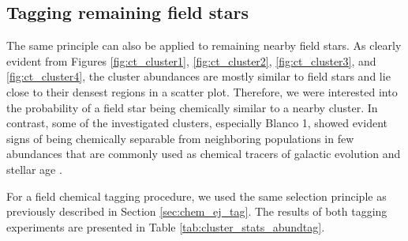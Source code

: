 \subsection{Tagging remaining field stars}
\label{sec:chem_fi_tag}
The same principle can also be applied to remaining nearby field stars. As clearly evident from Figures \ref{fig:ct_cluster1}, \ref{fig:ct_cluster2}, \ref{fig:ct_cluster3}, and \ref{fig:ct_cluster4}, the cluster abundances are mostly similar to field stars and lie close to their densest regions in a scatter plot. Therefore, we were interested into the probability of a field star being chemically similar to a nearby cluster. In contrast, some of the investigated clusters, especially Blanco 1, showed evident signs of being chemically separable from neighboring populations in few abundances that are commonly used as chemical tracers of galactic evolution and stellar age \citep{2003A&A...410..527B, 2018MNRAS.474.2580S, 2020MNRAS.491.2043L}.

For a field chemical tagging procedure, we used the same selection principle as previously described in Section \ref{sec:chem_ej_tag}. The results of both tagging experiments are presented in Table \ref{tab:cluster_stats_abundtag}.

